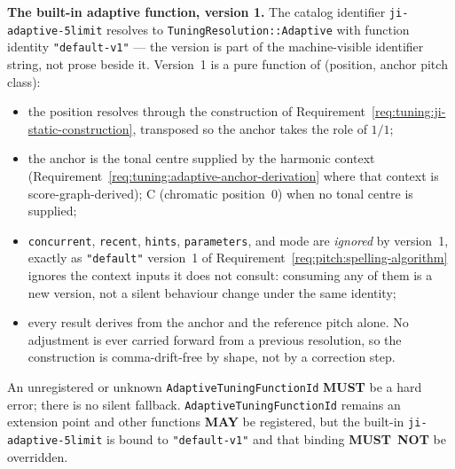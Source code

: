 \documentclass[11pt,letterpaper]{report}
\newcounter{requirement}[chapter]
\newcommand{\MUST}{\textbf{MUST}}
\newcommand{\MUSTNOT}{\textbf{MUST}\nobreak\ \textbf{NOT}}
\newcommand{\MAY}{\textbf{MAY}}
\begin{document}
\begin{requirement}
  \label{req:tuning:adaptive-default-version}
  \textbf{The built-in adaptive function, version 1.} The catalog
  identifier \texttt{ji-adaptive-5limit} resolves to
  \texttt{TuningResolution::Adaptive} with function identity
  \texttt{"default-v1"} --- the version is part of the
  machine-visible identifier string, not prose beside it. Version~1
  is a pure function of (position, anchor pitch class):
  \begin{itemize}
    \item the position resolves through the construction of
      Requirement~\ref{req:tuning:ji-static-construction}, transposed
      so the anchor takes the role of $1/1$;
    \item the anchor is the tonal centre supplied by the harmonic
      context (Requirement~\ref{req:tuning:adaptive-anchor-derivation}
      where that context is score-graph-derived); C (chromatic
      position~0) when no tonal centre is supplied;
    \item \texttt{concurrent}, \texttt{recent}, \texttt{hints},
      \texttt{parameters}, and mode are \emph{ignored} by version~1,
      exactly as \texttt{"default"} version~1 of
      Requirement~\ref{req:pitch:spelling-algorithm} ignores the
      context inputs it does not consult: consuming any of them is a
      new version, not a silent behaviour change under the same
      identity;
    \item every result derives from the anchor and the reference
      pitch alone. No adjustment is ever carried forward from a
      previous resolution, so the construction is comma-drift-free by
      shape, not by a correction step.
  \end{itemize}
  An unregistered or unknown \texttt{AdaptiveTuningFunctionId}
  \MUST{} be a hard error; there is no silent fallback.
  \texttt{AdaptiveTuningFunctionId} remains an extension point and
  other functions \MAY{} be registered, but the built-in
  \texttt{ji-adaptive-5limit} is bound to \texttt{"default-v1"} and
  that binding \MUSTNOT{} be overridden.
\end{requirement}
\end{document}
